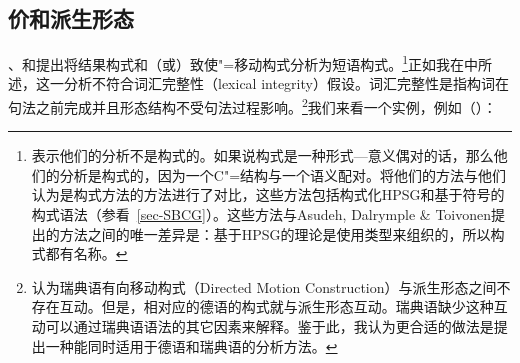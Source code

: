 \subsection{价和派生形态}
\label{sec-val-morph}\label{sec-phrasal-LI}\label{sec-inheritance-passive-LFG}
\citet{GJ2004a}、\citet{Alsina96a}和\citet*{ADT2008a,ADT2013a}提出将结果构式和（或）致使"=移动构式分析为短语构式。\footnote{%
\citet[\S~2.3]{AT2014a}表示他们的分析不是构式的。如果说构式是一种形式—意义偶对的话，那么他们的分析是构式的，因为一个C"=结构与一个语义配对。\citet[\S~2.2]{AT2014a}将他们的方法与他们认为是构式方法的方法进行了对比，这些方法包括构式化HPSG\citep{Sag97a}和基于符号的构式语法（参看~\ref{sec-SBCG}）。这些方法与Asudeh, Dalrymple \& Toivonen提出的方法之间的唯一差异是：基于HPSG的理论是使用类型来组织的，所以构式都有名称。%
}正如我在中所述，这一分析不符合词汇完整性（lexical integrity）假设。词汇完整性是指构词在句法之前完成并且形态结构不受句法过程影响\citep{BM95a}。\footnote{
  \citet[]{ADT2013a} 认为瑞典语有向移动构式（Directed Motion Construction）与派生形态之间不存在互动。但是，相对应的德语的构式就与派生形态互动。瑞典语缺少这种互动可以通过瑞典语语法的其它因素来解释。鉴于此，我认为更合适的做法是提出一种能同时适用于德语和瑞典语的分析方法。%
}我们来看一个实例，例如（）：

